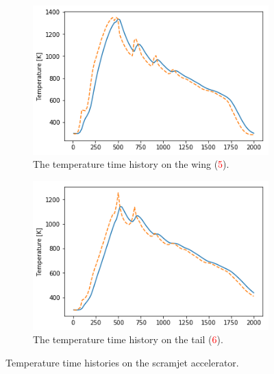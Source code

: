 \begin{figure}[!ht]
\begin{subfigure}{.5\textwidth}
	\end{subfigure}
	\begin{subfigure}{.5\textwidth}
		\centering
		\includegraphics[width=0.99\linewidth]{figures/A1_uncertainty-analysis/TPos3Return}
		\caption{The temperature time history on the wing (\textcolor{red}{5}).}
		
	\end{subfigure}
	\begin{subfigure}{.5\textwidth}
		\centering
		\includegraphics[width=0.99\linewidth]{figures/A1_uncertainty-analysis/TPos4Return}
		\caption{The temperature time history on the tail (\textcolor{red}{6}).}
		
	\end{subfigure}
	\caption{Temperature time histories on the scramjet accelerator.}
	\label{fig:TrajTemp}
\end{figure}


